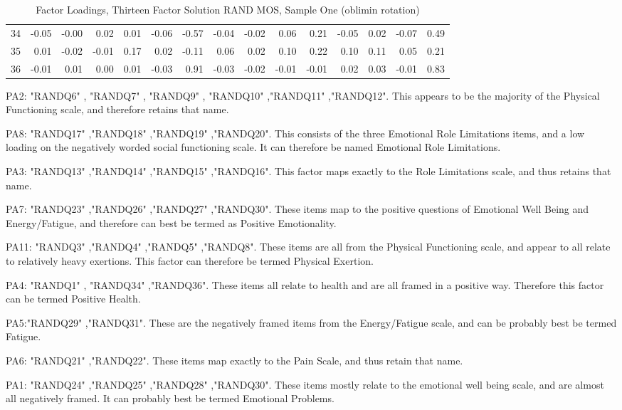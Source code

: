 \documentclass{article}
\begin{document}
\begin{table}[ht]
{\begin{tabular}{rrrrrrrrrrrrrrr}
  34 & -0.05 & -0.00 & 0.02 & 0.01 & -0.06 & -0.57 & -0.04 & -0.02 & 0.06 & 0.21 & -0.05 & 0.02 & -0.07 & 0.49 \\ 
  35 & 0.01 & -0.02 & -0.01 & 0.17 & 0.02 & -0.11 & 0.06 & 0.02 & 0.10 & 0.22 & 0.10 & 0.11 & 0.05 & 0.21 \\ 
  36 & -0.01 & 0.01 & 0.00 & 0.01 & -0.03 & 0.91 & -0.03 & -0.02 & -0.01 & -0.01 & 0.02 & 0.03 & -0.01 & 0.83 \\ 
   \hline
\end{tabular}
}
\caption{Factor Loadings, Thirteen Factor Solution RAND MOS, Sample One (oblimin rotation)} 
\label{tab:tcq1rand13fact}
\end{table}
PA2: "RANDQ6" , "RANDQ7" , "RANDQ9" , "RANDQ10" ,"RANDQ11" ,"RANDQ12". This appears to be the majority of the Physical Functioning scale, and therefore retains that name.


PA8: "RANDQ17" ,"RANDQ18" ,"RANDQ19" ,"RANDQ20". This consists of the three Emotional Role Limitations items, and a low loading on the negatively worded social functioning scale. It can therefore be named Emotional Role Limitations.

PA3: "RANDQ13" ,"RANDQ14" ,"RANDQ15" ,"RANDQ16". This factor maps exactly to the Role Limitations scale, and thus retains that name. 

PA7: "RANDQ23" ,"RANDQ26" ,"RANDQ27" ,"RANDQ30". These items map to the positive questions of Emotional Well Being and Energy/Fatigue, and therefore can best be termed as Positive Emotionality. 

PA11: "RANDQ3" ,"RANDQ4" ,"RANDQ5" ,"RANDQ8". These items are all from the Physical Functioning scale, and appear to all relate to relatively heavy exertions. This factor can therefore be termed Physical Exertion.

PA4: "RANDQ1" , "RANDQ34" ,"RANDQ36". These items all relate to health and are all framed in a positive way. Therefore this factor can be termed Positive Health.

PA5:"RANDQ29" ,"RANDQ31". These are the negatively framed items from the Energy/Fatigue scale, and can be probably best be termed Fatigue. 

PA6: "RANDQ21" ,"RANDQ22". These items map exactly to the Pain Scale, and thus retain that name. 

PA1: "RANDQ24" ,"RANDQ25" ,"RANDQ28" ,"RANDQ30". These items mostly relate to the emotional well being scale, and are almost all negatively framed. It can probably best be termed Emotional Problems.
\end{document}
